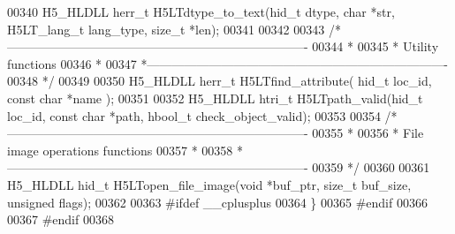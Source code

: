 \begin{DoxyCode}
00340 H5\_HLDLL herr\_t H5LTdtype\_to\_text(hid\_t dtype, \textcolor{keywordtype}{char} *str, H5LT\_lang\_t lang\_type, \textcolor{keywordtype}{size\_t} *len);
00341 
00342 
00343 \textcolor{comment}{/*-------------------------------------------------------------------------}
00344 \textcolor{comment}{ *}
00345 \textcolor{comment}{ * Utility functions}
00346 \textcolor{comment}{ *}
00347 \textcolor{comment}{ *-------------------------------------------------------------------------}
00348 \textcolor{comment}{ */}
00349 
00350 H5\_HLDLL herr\_t H5LTfind\_attribute( hid\_t loc\_id, \textcolor{keyword}{const} \textcolor{keywordtype}{char} *name );
00351 
00352 H5\_HLDLL htri\_t H5LTpath\_valid(hid\_t loc\_id, \textcolor{keyword}{const} \textcolor{keywordtype}{char} *path, hbool\_t check\_object\_valid);
00353 
00354 \textcolor{comment}{/*-------------------------------------------------------------------------}
00355 \textcolor{comment}{ *}
00356 \textcolor{comment}{ * File image operations functions}
00357 \textcolor{comment}{ *}
00358 \textcolor{comment}{ *-------------------------------------------------------------------------}
00359 \textcolor{comment}{ */}
00360 
00361 H5\_HLDLL hid\_t H5LTopen\_file\_image(\textcolor{keywordtype}{void} *buf\_ptr, \textcolor{keywordtype}{size\_t} buf\_size, \textcolor{keywordtype}{unsigned} flags);
00362 
00363 \textcolor{preprocessor}{#ifdef \_\_cplusplus}
00364 \}
00365 \textcolor{preprocessor}{#endif}
00366 
00367 \textcolor{preprocessor}{#endif}
00368 
\end{DoxyCode}
